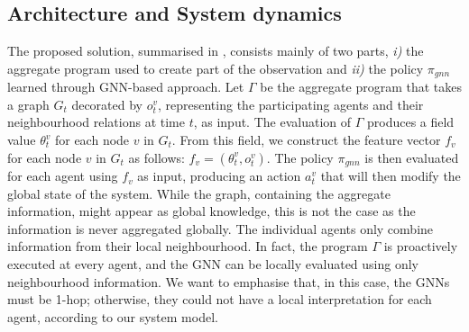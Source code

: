 \documentclass[conference]{IEEEtran}
\begin{document}
\subsection{Architecture and System dynamics}
The proposed solution, summarised in , consists mainly of two parts, 
\emph{i)} the aggregate program used to create part of the observation and 
\emph{ii)} the policy $\pi_{gnn}$ learned through \ac{GNN}-based approach. 
%
Let $\Gamma$ be the aggregate program that takes a graph $G_t$ decorated by $o^v_t$, 
 representing the participating agents and their neighbourhood relations at time $t$, as input. 
%
The evaluation of $\Gamma$ produces a field value $\theta^v_t$ for each node $v$ in $G_t$. 
From this field, we construct the feature vector $f_v$ for each node $v$ in $G_t$ as follows:
 $f_v = (\theta^v_t, o^v_t)$.
%
The policy $\pi_{gnn}$ is then evaluated for each agent using $f_v$ as input, 
 producing an action $a^v_t$ that will then modify the global state of the system.
%
While the graph, containing the aggregate information, 
 might appear as global knowledge, 
 this is not the case as the information is never aggregated globally. 
The individual agents only combine information from their local neighbourhood.
%
In fact, the program $\Gamma$ is proactively executed at every agent, 
and the \ac{GNN} can be locally evaluated using only neighbourhood information. 
%
We want to emphasise that, in this case, the \acp{GNN} must be 1-hop; 
otherwise, they could not have a local interpretation for each agent, according to our system model.
\end{document}
